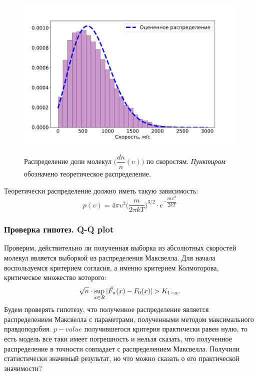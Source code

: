 \documentclass[twoside,twocolumn, 11pt]{article}
\theoremstyle{plain}
\theoremstyle{definition}
\DeclarePairedDelimiter\abs{\lvert}{\rvert} %
\begin{document}
\begin{figure}[!h]
{\includegraphics[width=1\linewidth]{hist_v}}
\caption{Распределение доли молекул $\Big(\dfrac{dn}{n} (\upsilon) \Big)$ по скоростям. \textit{Пунктиром} обозначено теоретическое распределение. }
\end{figure}

\indent Теоретически распределение должно иметь такую зависимость:
\begin{equation}
p(\upsilon) = 4\pi\upsilon^2 \Big( \dfrac{m}{2\pi kT} \Big)^{3/2}\cdot e^{-\dfrac{m \upsilon^2}{2kT}}
\end{equation}

\subsubsection{Проверка гипотез. Q-Q plot}
Проверим, действительно ли полученная выборка из абсолютных скоростей молекул является выборкой из распределения Максвелла. Для начала воспользуемся критерием согласия,
а именно критерием Колмогорова, критическое множество которого:
\[\sqrt{n} \cdot \sup\limits_{x \in R}{\abs{\hat{F_n}(x)- F_0(x)} > K_{1-\alpha}}. \]
Будем проверять гипотезу, что полученное распределение является распределением Максвелла с параметрами, полученными методом максимального правдоподобия. $p-value$ получившегося критерия
практически равен нулю, то есть модель все таки имеет погрешность и нельзя сказать, что полученное распределение в точности совпадает с распределением Максвелла. Получили статистически значимый результат,
но что можно сказать о его практической значимости?
\end{document}
